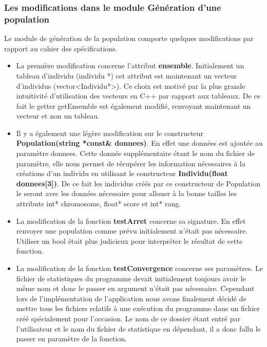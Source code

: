 \documentclass[a4paper,11pt]{article}
\begin{document}
   			\subsubsection{Les modifications dans le module Génération d’une population}
   				Le module de génération de la population comporte quelques modifications par rapport au cahier des spécifications.\\
   				\begin{itemize}
   					\item La première modification concerne l’attribut  \textbf{ensemble}. Initialement un tableau d’individu (individu *) cet attribut est maintenant un vecteur d’individus (vector<Individu*>). Ce choix est motivé par la plus grande intuitivité d’utilisation des vecteurs en C++ par rapport aux tableaux. De ce fait le getter getEnsemble est également modifié, renvoyant maintenant un vecteur et non un tableau.

   					\item Il y a également une légère modification sur le constructeur  \textbf{Population(string *const\& donnees)}. En effet une données est ajoutée au paramètre donnees. Cette donnée supplémentaire étant le nom du fichier de paramètre, elle nous permet de récupérer les information nécessaires à la créations d’un individu en utilisant le constructeur  \textbf{Individu(float donnees[3])}. De ce fait les individus créés par ce constructeur de Population le seront avec les données nécessaire pour allouer à la bonne tailles les attributs int* chromosome, float* score et int* rang.

   					\item La modification de la fonction  \textbf{testArret} concerne sa signature. En effet renvoyer une population comme prévu initialement n’était pas nécessaire. Utiliser un bool était plus judicieux pour interpréter le résultat de cette fonction.

   					\item La modification de la fonction  \textbf{testConvergence} concerne ses paramètres. Le fichier de statistiques du programme devait initialement toujours avoir le même nom et donc le passer en argument n’était pas nécessaire. Cependant lors de l’implémentation de l'application nous avons finalement décidé de mettre tous les fichiers relatifs à une exécution du programme dans un fichier créé spécialement pour l’occasion. Le nom de ce dossier étant entré par l’utilisateur et le nom du fichier de statistique en dépendant, il a donc fallu le passer en paramètre de la fonction.


\end{itemize}
\end{document}
